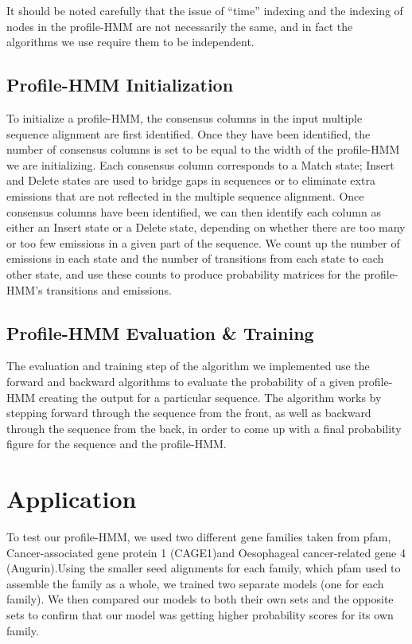 \documentclass{article}
\begin{document}
It should be noted carefully that the issue of ``time'' indexing and the indexing of nodes in the profile-HMM are not necessarily the same, and in fact the algorithms we use require them to be independent.

\subsection{Profile-HMM Initialization}

To initialize a profile-HMM, the consensus columns in the input multiple sequence alignment are first identified. Once they have been identified, the number of consensus columns is set to be equal to the width of the profile-HMM we are initializing. Each consensus column corresponds to a Match state; Insert and Delete states are used to bridge gaps in sequences or to eliminate extra emissions that are not reflected in the multiple sequence alignment. Once consensus columns have been identified, we can then identify each column as either an Insert state or a Delete state, depending on whether there are too many or too few emissions in a given part of the sequence. We count up the number of emissions in each state and the number of transitions from each state to each other state, and use these counts to produce probability matrices for the profile-HMM's transitions and emissions.

\subsection{Profile-HMM Evaluation \& Training}
The evaluation and training step of the algorithm we implemented use the forward and backward algorithms to evaluate the probability of a given profile-HMM creating the output for a particular sequence. The algorithm works by stepping forward through the sequence from the front, as well as backward through the sequence from the back, in order to come up with a final probability figure for the sequence and the profile-HMM.

\section{Application}
To test our profile-HMM, we used two different gene families taken from pfam, Cancer-associated gene protein 1 (CAGE1)\footnotemark[3] and Oesophageal cancer-related gene 4 (Augurin).\footnotemark[4] Using the smaller seed alignments for each family, which pfam used to assemble the family as a whole, we trained two separate models (one for each family). We then compared our models to both their own sets and the opposite sets to confirm that our model was getting higher probability scores for its own family.
\end{document}
